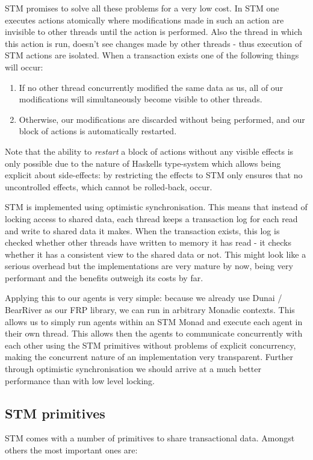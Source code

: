 STM promises to solve all these problems for a very low cost. In STM one executes actions atomically where modifications made in such an action are invisible to other threads until the action is performed. Also the thread in which this action is run, doesn't see changes made by other threads - thus execution of STM actions are isolated. When a transaction exists one of the following things will occur:

\begin{enumerate}
	\item If no other thread concurrently modified the same data as us, all of our modifications will simultaneously become visible to other threads.
	\item Otherwise, our modifications are discarded without being performed, and our block of actions is automatically restarted.
\end{enumerate}

Note that the ability to \textit{restart} a block of actions without any visible effects is only possible due to the nature of Haskells type-system which allows being explicit about side-effects: by restricting the effects to STM only ensures that no uncontrolled effects, which cannot be rolled-back, occur.

STM is implemented using optimistic synchronisation. This means that instead of locking access to shared data, each thread keeps a transaction log for each read and write to shared data it makes. When the transaction exists, this log is checked whether other threads have written to memory it has read - it checks whether it has a consistent view to the shared data or not. This might look like a serious overhead but the implementations are very mature by now, being very performant and the benefits outweigh its costs by far.

Applying this to our agents is very simple: because we already use Dunai / BearRiver as our FRP library, we can run in arbitrary Monadic contexts. This allows us to simply run agents within an STM Monad and execute each agent in their own thread. This allows then the agents to communicate concurrently with each other using the STM primitives without problems of explicit concurrency, making the concurrent nature of an implementation very transparent. Further through optimistic synchronisation we should arrive at a much better performance than with low level locking.

\subsection{STM primitives}
STM comes with a number of primitives to share transactional data. Amongst others the most important ones are:


